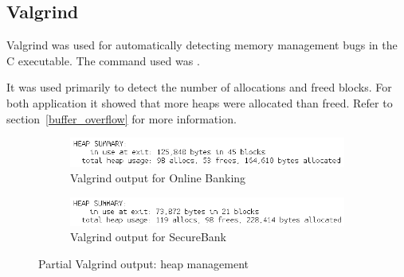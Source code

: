 \subsection{Valgrind}
Valgrind was used for automatically detecting memory management bugs in the C executable. The command used was .

It was used primarily to detect the number of allocations and freed blocks. For both application it showed that more heaps were allocated than freed. Refer to section~\ref{buffer_overflow} for more information.

\begin{figure}[ht]
	\centering
	\begin{subfigure}{.5\textwidth}
		\centering
		\includegraphics[width=.9\linewidth]{figures/valgrind_onlinebanking.png}
		\caption{Valgrind output for Online Banking}
	\end{subfigure}%
	\begin{subfigure}{.5\textwidth}
		\centering
		\includegraphics[width=.9\linewidth]{figures/valgrind_securebank.png}
		\caption{Valgrind output for SecureBank}
	\end{subfigure}
	\caption{Partial Valgrind output: heap management}
	\label{fig:cryptoshark}
\end{figure}